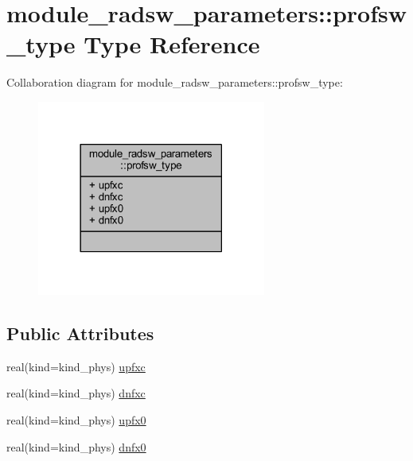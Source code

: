 \hypertarget{structmodule__radsw__parameters_1_1profsw__type}{}\section{module\+\_\+radsw\+\_\+parameters\+:\+:profsw\+\_\+type Type Reference}
\label{structmodule__radsw__parameters_1_1profsw__type}


Collaboration diagram for module\+\_\+radsw\+\_\+parameters\+:\+:profsw\+\_\+type\+:\nopagebreak
\begin{figure}[H]
\begin{center}
\leavevmode
\includegraphics[width=213pt]{structmodule__radsw__parameters_1_1profsw__type__coll__graph}
\end{center}
\end{figure}
\subsection*{Public Attributes}
\begin{DoxyCompactItemize}
\item 
real(kind=kind\+\_\+phys) \hyperlink{structmodule__radsw__parameters_1_1profsw__type_a5122ef2eef4e86a7aadf77114da4b3e2}{upfxc}
\item 
real(kind=kind\+\_\+phys) \hyperlink{structmodule__radsw__parameters_1_1profsw__type_a4d253ac17ae97351a0a3eb15ab4d55e4}{dnfxc}
\item 
real(kind=kind\+\_\+phys) \hyperlink{structmodule__radsw__parameters_1_1profsw__type_aa9205ed3a95d61dd8e4e7184fd6da43e}{upfx0}
\item 
real(kind=kind\+\_\+phys) \hyperlink{structmodule__radsw__parameters_1_1profsw__type_aff3ff3155ed05a18fa7caba351d1c503}{dnfx0}
\end{DoxyCompactItemize}


